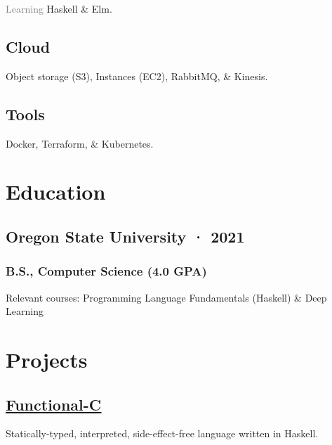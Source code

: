 \documentclass[12pt]{article} %
\let\defaultref\href
\renewcommand{\href}[2]{%
  \defaultref{#1}{\ul{#2}}%
}
\renewcommand{\emph}[1]{%
  \textcolor{gray}{#1}%
}
\begin{document}
\begin{paracol}{2}
\begin{raggedright}
\emph{Learning} Haskell \& Elm.

\hypertarget{cloud}{%
\subsection{Cloud}\label{cloud}}

Object storage (S3), Instances (EC2), RabbitMQ, \& Kinesis.

\hypertarget{tools}{%
\subsection{Tools}\label{tools}}

Docker, Terraform, \& Kubernetes.

\hypertarget{education}{%
\section{Education}\label{education}}

\hypertarget{oregon-state-university-2021}{%
\subsection{Oregon State University ·
2021}\label{oregon-state-university-2021}}

\vspace{-5pt}

\hypertarget{b.s.-computer-science-4.0-gpa}{%
\subsubsection{B.S., Computer Science (4.0
GPA)}\label{b.s.-computer-science-4.0-gpa}}

Relevant courses: Programming Language Fundamentals (Haskell) \& Deep
Learning

\hypertarget{projects}{%
\section{Projects}\label{projects}}

\hypertarget{functional-c}{%
\subsection{\texorpdfstring{\href{https://github.com/julianfortune/CS381Project}{Functional-C}}{Functional-C}}\label{functional-c}}

Statically-typed, interpreted, side-effect-free language written in
Haskell.


\end{raggedright}
\end{paracol}
\end{document}
